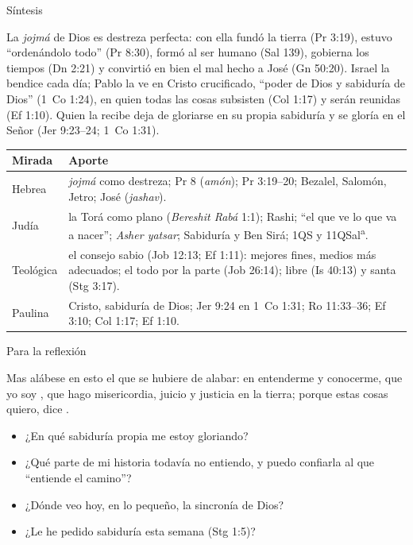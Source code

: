 \begin{frame}{Síntesis}
\begin{tcolorbox}[colback=papiro,colframe=azul,boxrule=1pt,arc=3pt]
\small La \emph{jojmá} de Dios es destreza perfecta: con ella fundó la tierra (Pr 3:19), estuvo ``ordenándolo todo'' (Pr 8:30), formó al ser humano (Sal 139), gobierna los tiempos (Dn 2:21) y convirtió en bien el mal hecho a José (Gn 50:20). Israel la bendice cada día; Pablo la ve en Cristo crucificado, ``poder de Dios y sabiduría de Dios'' (1~Co 1:24), en quien todas las cosas subsisten (Col 1:17) y serán reunidas (Ef 1:10). Quien la recibe deja de gloriarse en su propia sabiduría y se gloría en el Señor (Jer 9:23--24; 1~Co 1:31).
\end{tcolorbox}
\scriptsize\renewcommand{\arraystretch}{1.15}
\begin{tabular}{@{}>{\RaggedRight\arraybackslash}p{2.4cm}>{\RaggedRight\arraybackslash}p{9.4cm}@{}}
\toprule
\textbf{Mirada} & \textbf{Aporte} \\ \midrule
Hebrea & \emph{jojmá} como destreza; Pr 8 (\emph{amón}); Pr 3:19--20; Bezalel, Salomón, Jetro; José (\emph{jashav}). \\
Judía & la Torá como plano (\emph{Bereshit Rabá} 1:1); Rashi; ``el que ve lo que va a nacer''; \emph{Asher yatsar}; Sabiduría y Ben Sirá; 1QS y 11QSal\textsuperscript{a}. \\
Teológica & el consejo sabio (Job 12:13; Ef 1:11): mejores fines, medios más adecuados; el todo por la parte (Job 26:14); libre (Is 40:13) y santa (Stg 3:17). \\
Paulina & Cristo, sabiduría de Dios; Jer 9:24 en 1~Co 1:31; Ro 11:33--36; Ef 3:10; Col 1:17; Ef 1:10. \\
\bottomrule
\end{tabular}
\end{frame}

\begin{frame}{Para la reflexión}
\begin{cita}Mas alábese en esto el que se hubiere de alabar: en entenderme y conocerme, que yo soy \SENOR, que hago misericordia, juicio y justicia en la tierra; porque estas cosas quiero, dice \SENOR.\end{cita}
\begin{center}\end{center}
\small
\begin{itemize}
\item ¿En qué sabiduría propia me estoy gloriando?
\item ¿Qué parte de mi historia todavía no entiendo, y puedo confiarla al que ``entiende el camino''?
\item ¿Dónde veo hoy, en lo pequeño, la sincronía de Dios?
\item ¿Le he pedido sabiduría esta semana (Stg 1:5)?
\end{itemize}
\end{frame}

